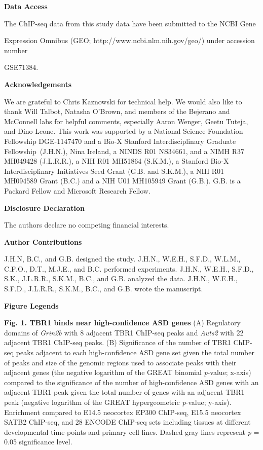 \documentclass[]{article}
\begin{document}
\textbf{Data Access}

The ChIP-seq data from this study data have been submitted to the NCBI
Gene

Expression Omnibus (GEO; http://www.ncbi.nlm.nih.gov/geo/) under
accession number

GSE71384.

\textbf{Acknowledgements}

We are grateful to Chris Kaznowski for technical help. We would also
like to thank Will Talbot, Natasha O'Brown, and members of the Bejerano
and McConnell labs for helpful comments, especially Aaron Wenger, Geetu
Tuteja, and Dino Leone. This work was supported by a National Science
Foundation Fellowship DGE-1147470 and a Bio-X Stanford Interdisciplinary
Graduate Fellowship~(J.H.N.), Nina Ireland, a NINDS R01 NS34661, and a
NIMH R37 MH049428 (J.L.R.R.), a NIH R01 MH51864 (S.K.M.), a Stanford
Bio-X Interdisciplinary Initiatives Seed Grant (G.B. and S.K.M.), a NIH
R01 MH094589 Grant (B.C.) and a NIH U01 MH105949 Grant (G.B.). G.B. is a
Packard Fellow and Microsoft Research Fellow.

\textbf{Disclosure Declaration}

The authors declare no competing financial interests.

\textbf{Author Contributions}

J.H.N, B.C., and G.B. designed the study. J.H.N., W.E.H., S.F.D.,
W.L.M., C.F.O., D.T., M.J.E., and B.C. performed experiments. J.H.N.,
W.E.H., S.F.D., S.K., J.L.R.R., S.K.M., B.C., and G.B. analyzed the
data. J.H.N., W.E.H., S.F.D., J.L.R.R., S.K.M., B.C., and G.B. wrote the
manuscript.\textbf{\\
}

\textbf{Figure Legends}

\textbf{Fig. 1. TBR1 binds near high-confidence ASD genes} (A)
Regulatory domains of \emph{Grin2b} with 8 adjacent TBR1 ChIP-seq peaks
and \emph{Auts2} with 22 adjacent TBR1 ChIP-seq peaks. (B) Significance
of the number of TBR1 ChIP-seq peaks adjacent to each high-confidence
ASD gene set given the total number of peaks and size of the genomic
regions used to associate peaks with their adjacent genes (the negative
logarithm of the GREAT binomial \emph{p}-value; x-axis) compared to the
significance of the number of high-confidence ASD genes with an adjacent
TBR1 peak given the total number of genes with an adjacent TBR1 peak
(negative logarithm of the GREAT hypergeometric \emph{p}-value; y-axis).
Enrichment compared to E14.5 neocortex EP300 ChIP-seq, E15.5 neocortex
SATB2 ChIP-seq, and 28 ENCODE ChIP-seq sets including tissues at
different developmental time-points and primary cell lines. Dashed gray
lines represent \emph{p} = 0.05 significance level.
\end{document}
